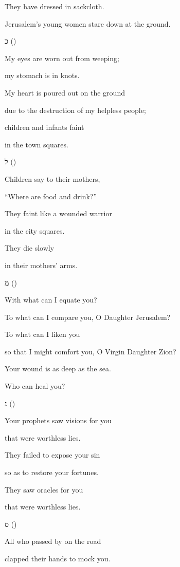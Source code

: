 {\par }{\Q They have dressed in sackcloth.
\par }{\Q Jerusalem’s young women stare down at the ground.
\par }{\SH כ ({})
\par }{\Q {}My eyes are worn out from weeping;
\par }{\Q my stomach is in knots.
\par }{\Q My heart is poured out on the ground
\par }{\Q due to the destruction of my helpless people;
\par }{\Q children and infants faint
\par }{\Q in the town squares.
\par }{\SH ל ({})
\par }{\Q {}Children say to their mothers,
\par }{\Q “Where are food and drink?”
\par }{\Q They faint like a wounded warrior
\par }{\Q in the city squares.
\par }{\Q They die slowly
\par }{\Q in their mothers’ arms.
\par }{\SH מ ({})
\par }{\Q {}With what can I equate you?
\par }{\Q To what can I compare you, O Daughter Jerusalem?
\par }{\Q To what can I liken you
\par }{\Q so that I might comfort you, O Virgin Daughter Zion?
\par }{\Q Your wound is as deep as the sea.
\par }{\Q Who can heal you?
\par }{\SH נ ({})
\par }{\Q {}Your prophets saw visions for you
\par }{\Q that were worthless lies.
\par }{\Q They failed to expose your sin
\par }{\Q so as to restore your fortunes.
\par }{\Q They saw oracles for you
\par }{\Q that were worthless lies.
\par }{\SH ס ({})
\par }{\Q {}All who passed by on the road
\par }{\Q clapped their hands to mock you.
}
